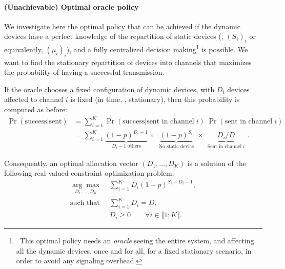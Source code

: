 \paragraph{(Unachievable) Optimal oracle policy}

We investigate here the optimal policy that can be achieved if the dynamic devices have a perfect knowledge of the repartition of static devices (\ie, $(S_i)_i$ or equivalently, $(\mu_i)_i$), and a fully centralized decision making\footnote{~This optimal policy needs an \emph{oracle} seeing the entire system, and affecting all the dynamic devices, once and for all, for a fixed stationary scenario, in order to avoid any signaling overhead.} is possible.
We want to find the stationary repartition of devices into channels that maximizes the probability of having a successful transmission.

If the oracle chooses a fixed configuration of dynamic devices, with $D_i$ devices affected to channel $i$ is fixed (in time, \ie, stationary),
then this probability is computed as before:
\begin{align}\label{eq:41:prob_col}
    \Pr(\text{success}|\text{sent})
    & = \sum_{i=1}^{K} \Pr(\text{success}|\text{sent in channel}\;i) \; \Pr(\text{sent in channel}\;i) \nonumber \\
    & = \sum_{i=1}^{K} \underbrace{(1 - p)^{D_i - 1}}_{\;\;D_i - 1 \;\text{others}\;\;} \times \underbrace{(1 - p)^{S_i}}_{\;\;\text{No static device}\;\;} \times \underbrace{ D_i / D }_{\;\;\text{Sent in channel}\; i\;\;}.
\end{align}

Consequently, an optimal allocation vector $(D_1,\dots,D_{K})$ is a solution of the following real-valued constraint optimization problem:
%
\begin{subequations}\label{eq:41:prob}
\begin{align}
    \underset{D_1,\dots,D_{K}}{\arg\max}\; & \sum_{i=1}^{K} D_i (1 - p)^{S_i + D_i -1}, \label{eq:41:optPb}\\
    \text{such that}\;\; & \sum_{i=1}^{K} D_i = D, \label{eq:41:eqCstr}\\
    & D_i \geq 0 \qquad \forall i\in\llbracket 1;K\rrbracket . \label{eq:41:ineqCstr}
\end{align}
\end{subequations}

